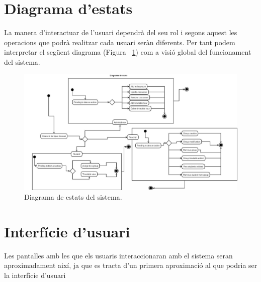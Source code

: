 \documentclass[a4paper]{report}  %
\begin{document}
\section{Diagrama d'estats}
La manera d'interactuar de l'usuari dependrà del seu rol i segons aquest les operacions que podrà realitzar cada usuari seràn diferents. Per tant podem interpretar el següent diagrama (Figura ~\ref{fig:DiagramaEstats-1r}) com a visió global del funcionament del sistema.
		\begin{figure}[H] %
		\begin{center}
		\includegraphics[width=14cm,keepaspectratio]{img/DiagramaEstats-1r.jpg}
		\caption[List caption]{Diagrama de estats del sistema.}
		\label{fig:DiagramaEstats-1r}
		\end{center}
		\end{figure}
\section{Interfície d'usuari}
Les pantalles amb les que els usuaris interaccionaran amb el sistema seran aproximadament així, ja que es tracta d'un primera aproximació al que podria ser la interfície d'usuari
\end{document}
